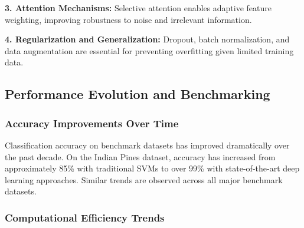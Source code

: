\documentclass[journal]{IEEEtran}
\begin{document}
\textbf{3. Attention Mechanisms:} Selective attention enables adaptive feature weighting, improving robustness to noise and irrelevant information.

\textbf{4. Regularization and Generalization:} Dropout, batch normalization, and data augmentation are essential for preventing overfitting given limited training data.

\subsection{Performance Evolution and Benchmarking}

\subsubsection{Accuracy Improvements Over Time}

Classification accuracy on benchmark datasets has improved dramatically over the past decade. On the Indian Pines dataset, accuracy has increased from approximately 85\% with traditional SVMs to over 99\% with state-of-the-art deep learning approaches. Similar trends are observed across all major benchmark datasets.

\subsubsection{Computational Efficiency Trends}
\end{document}
